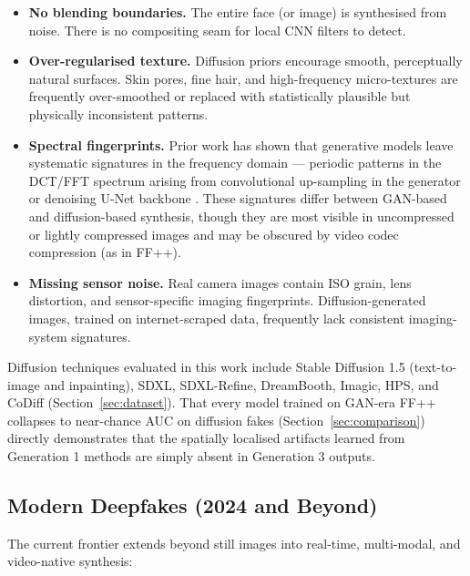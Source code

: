 \documentclass[conference]{IEEEtran}
\begin{document}
\begin{itemize}
  \item \textbf{No blending boundaries.} The entire face (or image) is synthesised from noise. There is no compositing seam for local CNN filters to detect.

  \item \textbf{Over-regularised texture.} Diffusion priors encourage smooth, perceptually natural surfaces. Skin pores, fine hair, and high-frequency micro-textures are frequently over-smoothed or replaced with statistically plausible but physically inconsistent patterns.

  \item \textbf{Spectral fingerprints.} Prior work has shown that generative models leave systematic signatures in the frequency domain --- periodic patterns in the DCT/FFT spectrum arising from convolutional up-sampling in the generator or denoising U-Net backbone \cite{durall2020watch,frank2020leveraging}. These signatures differ between GAN-based and diffusion-based synthesis, though they are most visible in uncompressed or lightly compressed images and may be obscured by video codec compression (as in FF++).

  \item \textbf{Missing sensor noise.} Real camera images contain ISO grain, lens distortion, and sensor-specific imaging fingerprints. Diffusion-generated images, trained on internet-scraped data, frequently lack consistent imaging-system signatures.
\end{itemize}

Diffusion techniques evaluated in this work include Stable Diffusion 1.5 (text-to-image and inpainting), SDXL, SDXL-Refine, DreamBooth, Imagic, HPS, and CoDiff (Section~\ref{sec:dataset}). That every model trained on GAN-era FF++ collapses to near-chance AUC on diffusion fakes (Section~\ref{sec:comparison}) directly demonstrates that the spatially localised artifacts learned from Generation 1 methods are simply absent in Generation 3 outputs.

\subsection{Modern Deepfakes (2024 and Beyond)}

The current frontier extends beyond still images into real-time, multi-modal, and video-native synthesis:
\end{document}
